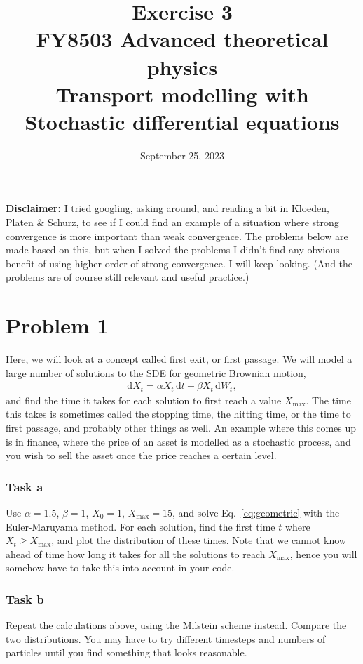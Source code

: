 \documentclass[a4paper]{article}
\title{\vspace{-3em} Exercise 3\\[10pt] \large FY8503 Advanced theoretical physics\\  Transport modelling with Stochastic differential equations}
\author{September 25, 2023}
\date{}
\begin{document}
\maketitle

{\bf Disclaimer:} I tried googling, asking around, and reading a bit in Kloeden, Platen \& Schurz, to see if I could find an example of a situation where strong convergence is more important than weak convergence. The problems below are made based on this, but when I solved the problems I didn't find any obvious benefit of using higher order of strong convergence. I will keep looking. (And the problems are of course still relevant and useful practice.)

\section*{Problem 1}

Here, we will look at a concept called first exit, or first passage. We will model a large number of solutions to the SDE for geometric Brownian motion,
\begin{align}
    \label{eq:geometric}
    \mathrm{d} X_t = \alpha X_t \, \mathrm{d}t + \beta X_t \, \mathrm{d}W_t,
\end{align}
and find the time it takes for each solution to first reach a value $X_\mathrm{max}$. The time this takes is sometimes called the stopping time, the hitting time, or the time to first passage, and probably other things as well. An example where this comes up is in finance, where the price of an asset is modelled as a stochastic process, and you wish to sell the asset once the price reaches a certain level.


\subsubsection*{Task a}
Use $\alpha=1.5$, $\beta=1$, $X_0=1$, $X_\mathrm{max}=15$, and solve Eq.~\eqref{eq:geometric} with the Euler-Maruyama method. For each solution, find the first time $t$ where $X_t \geq X_\mathrm{max}$, and plot the distribution of these times. Note that we cannot know ahead of time how long it takes for all the solutions to reach $X_\mathrm{max}$, hence you will somehow have to take this into account in your code.

\subsubsection*{Task b}
Repeat the calculations above, using the Milstein scheme instead. Compare the two distributions. You may have to try different timesteps and numbers of particles until you find something that looks reasonable.
\end{document}
